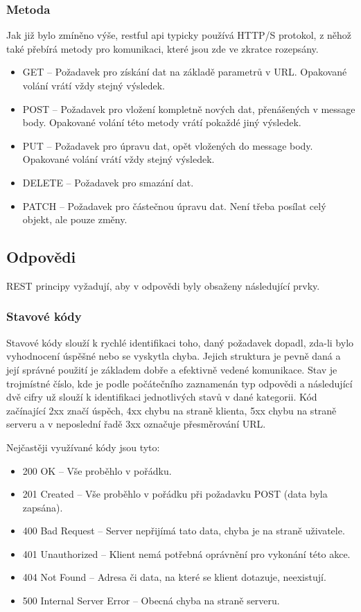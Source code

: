 \subsubsection*{Metoda}
Jak již bylo zmíněno výše, \gls{restful api} typicky používá HTTP/S protokol, z něhož také přebírá metody pro komunikaci, které jsou zde ve zkratce rozepsány.

\begin{itemize}
    \item GET -- Požadavek pro získání dat na základě parametrů v URL. Opakované volání vrátí vždy stejný výsledek.
    \item POST -- Požadavek pro vložení kompletně nových dat, přenášených v message body. Opakované volání této metody vrátí pokaždé jiný výsledek.
    \item PUT -- Požadavek pro úpravu dat, opět vložených do message body. Opakované volání vrátí vždy stejný výsledek.
    \item DELETE -- Požadavek pro smazání dat.
    \item PATCH -- Požadavek pro částečnou úpravu dat. Není třeba posílat celý objekt, ale pouze změny.
\end{itemize}


\subsection{Odpovědi}
REST principy vyžadují, aby v odpovědi byly obsaženy následující prvky.

\subsubsection*{Stavové kódy}
Stavové kódy slouží k rychlé identifikaci toho, daný požadavek dopadl, zda-li bylo vyhodnocení úspěšné nebo se vyskytla chyba. Jejich struktura je pevně daná a její správné použití je základem dobře a efektivně vedené komunikace. Stav je trojmístné číslo, kde je podle počátečního zaznamenán typ odpovědi a následující dvě cifry už slouží k identifikaci jednotlivých stavů v dané kategorii. Kód začínající 2xx značí úspěch, 4xx chybu na straně klienta, 5xx chybu na straně serveru a v neposlední řadě 3xx označuje přesměrování URL.

Nejčastěji využívané kódy jsou tyto:

\begin{itemize}
    \item 200 OK -- Vše proběhlo v pořádku.
    \item 201 Created -- Vše proběhlo v pořádku při požadavku POST (data byla zapsána).
    \item 400 Bad Request -- Server nepřijímá tato data, chyba je na straně uživatele.
    \item 401 Unauthorized -- Klient nemá potřebná oprávnění pro vykonání této akce.
    \item 404 Not Found -- Adresa či data, na které se klient dotazuje, neexistují.
    \item 500 Internal Server Error -- Obecná chyba na straně serveru.
\end{itemize}



